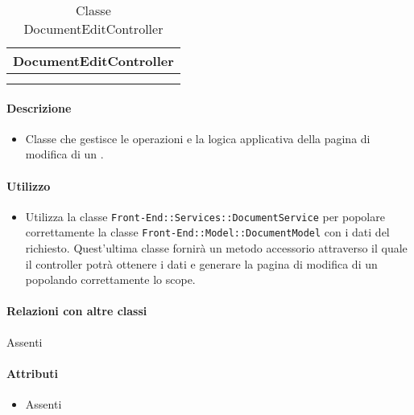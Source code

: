 \begin{table}[ht]
\begin{center}
\bgroup
\setlength{\arrayrulewidth}{0.6mm}
\def\arraystretch{1}
\begin{tabular}{ | p{12cm} | }
\hline
\centerline{\textbf{DocumentEditController}}
\\ \hline
 \\ 
\hline
 \\ 
\hline
\end{tabular}
\egroup
\caption{Classe DocumentEditController}
\end{center}
\end{table}

\paragraph*{Descrizione}
\begin{itemize}
\item[] Classe che gestisce le operazioni e la logica applicativa della pagina di modifica di un .
\end{itemize}

\paragraph*{Utilizzo}
\begin{itemize}
\item[] Utilizza la classe \texttt{Front-End::Services::DocumentService} per popolare correttamente la classe \texttt{Front-End::Model::DocumentModel} con i dati del  richiesto. Quest'ultima classe fornirà un metodo accessorio attraverso il quale il controller potrà ottenere i dati e generare la pagina di modifica di un  popolando correttamente lo scope.
\end{itemize}

\paragraph*{Relazioni con altre classi}
Assenti

\paragraph*{Attributi}
\begin{itemize}
\item[] Assenti
\end{itemize}

